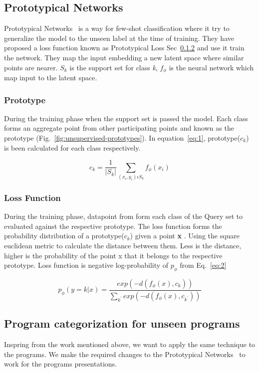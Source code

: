 \subsection{Prototypical Networks}
Prototypical Networks~\cite{protonet:NIPS2017} is a way for few-shot classification where it try to generalize the model to the unseen label at the time of training. They have proposed a loss function known as Prototypical Loss Sec~\ref{sec:algo:proto:loss} and use it train the network. They map the input embedding a new latent space where similar points are nearer. $S_{k}$ is the support set for class \textit{k}, $f_{\phi}$ is the neural network which map input to the latent space.

\subsubsection{Prototype}
During the training phase when the support set is passed the model. Each class forms an aggregate point from other participating points and known as the prototype (Fig.~\ref{fig:unsupervised-prototypes}). In equation~\ref{eq:1}, prototype($c_{k}$) is been calculated for each class respectively. 

 
\begin{equation} \label{eq:1}
c_{k} = \frac{1}{|S_{k}|}  \sum_{(x_{i},y_{i}) \epsilon S_{k}}  f_{ \phi }(x_{i})
\end{equation}

\subsubsection{Loss Function}\label{sec:algo:proto:loss}
During the training phase, datapoint from form each class of the Query set to evaluated against the respective prototype. The loss function forms the probability distribution of a prototype($c_{k}$) given a point \textbf{x} . Using the square euclidean metric to calculate the distance between them. Less is the distance, higher  is the probability of the point x that it belongs to the respective prototype. Loss function is negative log-probability of $p_{\phi}$ from Eq.~\ref{eq:2} %

\begin{equation}\label{eq:2}
p_{ \phi }(y = k | x) =  \frac{exp(-d(f_{\phi}(x), c_{k}))}{\sum_{k^{'} }exp(-d(f_{\phi}(x), c_{k^{'}}))} 
\end{equation}

\subsection{Program categorization for unseen programs}
Inspring from the work mentioned above, we want to apply the same technique to the programs. We make the required changes to the Prototypical Networks~\cite{protonet:NIPS2017} to work for the programs presentations.  

